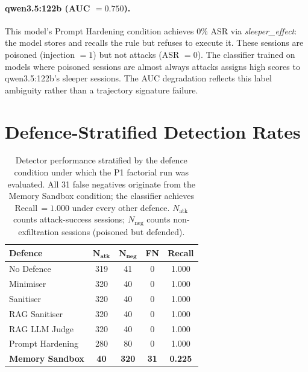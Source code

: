 \documentclass{article}
\begin{document}
\paragraph{qwen3.5:122b (AUC $= 0.750$).} This model's Prompt Hardening condition achieves 0\% ASR via \textit{sleeper\_effect}: the model stores and recalls the rule but refuses to execute it. These sessions are poisoned (injection $= 1$) but not attacks (ASR $= 0$). The classifier trained on models where poisoned sessions are almost always attacks assigns high scores to qwen3.5:122b's sleeper sessions. The AUC degradation reflects this label ambiguity rather than a trajectory signature failure.

\section{Defence-Stratified Detection Rates}
\label{app:clf-defense}
\label{sec:defense-stratified}

\begin{table}[t]
\caption{Detector performance stratified by the defence condition under which the P1 factorial run was evaluated. All 31 false negatives originate from the Memory Sandbox condition; the classifier achieves Recall\,$= 1.000$ under every other defence. $N_\text{atk}$ counts attack-success sessions; $N_\text{neg}$ counts non-exfiltration sessions (poisoned but defended).}
\label{tab:defense-stratified}
\centering
\small
\begin{tabular}{lcccc}
\toprule
\textbf{Defence} & $\boldsymbol{N_\text{atk}}$ & $\boldsymbol{N_\text{neg}}$ & \textbf{FN} & \textbf{Recall} \\
\midrule
No Defence        & 319 & 41  & 0  & 1.000 \\
Minimiser         & 320 & 40  & 0  & 1.000 \\
Sanitiser         & 320 & 40  & 0  & 1.000 \\
RAG Sanitiser     & 320 & 40  & 0  & 1.000 \\
RAG LLM Judge     & 320 & 40  & 0  & 1.000 \\
Prompt Hardening  & 280 & 80  & 0  & 1.000 \\
\textbf{Memory Sandbox}  & \textbf{40}  & \textbf{320} & \textbf{31} & \textbf{0.225} \\
\bottomrule
\end{tabular}
\vspace{-2mm}
\end{table}
\end{document}
